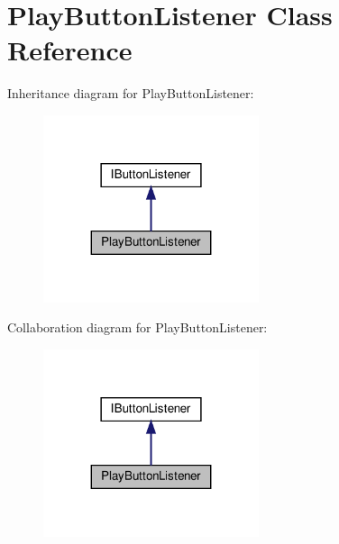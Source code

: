 \hypertarget{classPlayButtonListener}{}\section{Play\+Button\+Listener Class Reference}
\label{classPlayButtonListener}


Inheritance diagram for Play\+Button\+Listener\+:
\nopagebreak
\begin{figure}[H]
\begin{center}
\leavevmode
\includegraphics[width=179pt]{classPlayButtonListener__inherit__graph}
\end{center}
\end{figure}


Collaboration diagram for Play\+Button\+Listener\+:
\nopagebreak
\begin{figure}[H]
\begin{center}
\leavevmode
\includegraphics[width=179pt]{classPlayButtonListener__coll__graph}
\end{center}
\end{figure}
